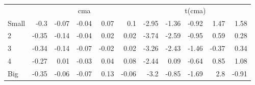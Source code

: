 \begin{table}[!ht]
\begin{tabular}{lrrrrrrrrrr}
  

      & \multicolumn{5}{c}{cma} & \multicolumn{5}{c}{t(cma)} \\
    \cmidrule(r){2-6} \cmidrule(r){7-11}
      Small  & -0.3  & -0.07  & -0.04  & 0.07  & 0.1   & -2.95  & -1.36  & -0.92  & 1.47  & 1.58  \\
          2  & -0.35  & -0.14  & -0.04  & 0.02  & 0.02   & -3.74  & -2.59  & -0.95  & 0.59  & 0.28  \\
          3  & -0.34  & -0.14  & -0.07  & -0.02  & 0.02   & -3.26  & -2.43  & -1.46  & -0.37  & 0.34  \\
          4  & -0.27  & 0.01  & -0.03  & 0.04  & 0.08   & -2.44  & 0.09  & -0.64  & 0.85  & 1.08  \\
      Big    & -0.35  & -0.06  & -0.07  & 0.13  & -0.06   & -3.2  & -0.85  & -1.69  & 2.8  & -0.91  \\

  

  \bottomrule
\end{tabular}
\label{tbl:25_Size_Mom_FF2016b}
\end{table}
